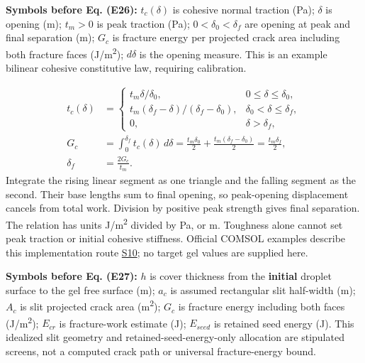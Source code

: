 \documentclass[10pt,a4paper]{article}
\begin{document}
\textbf{Symbols before Eq. (E26):} $t_c(\delta)$ is cohesive normal traction (Pa); $\delta$ is opening (m); $t_m>0$ is peak traction (Pa); $0<\delta_0<\delta_f$ are opening at peak and final separation (m); $G_c$ is fracture energy per projected crack area including both fracture faces (J/m\textsuperscript{2}); $d\delta$ is the opening measure. This is an example bilinear cohesive constitutive law, requiring calibration.

{\small\begin{align*}
t_c(\delta)&=\begin{cases}
t_m\delta/\delta_0,&0\le\delta\le\delta_0,\\
t_m(\delta_f-\delta)/(\delta_f-\delta_0),&\delta_0<\delta\le\delta_f,\\
0,&\delta>\delta_f,
\end{cases}\\
G_c&=\int_0^{\delta_f}t_c(\delta)\,d\delta
=\frac{t_m\delta_0}{2}+\frac{t_m(\delta_f-\delta_0)}2
=\frac{t_m\delta_f}{2},\\
\delta_f&=\frac{2G_c}{t_m}. \tag{E26}
\end{align*}}
Integrate the rising linear segment as one triangle and the falling segment as the second. Their base lengths sum to final opening, so peak-opening displacement cancels from total work. Division by positive peak strength gives final separation. The relation has units J/m\textsuperscript{2} divided by Pa, or m. Toughness alone cannot set peak traction or initial cohesive stiffness. Official COMSOL examples describe this implementation route \href{../../SOURCES.md}{S10}; no target gel values are supplied here.

\textbf{Symbols before Eq. (E27):} $h$ is cover thickness from the \textbf{initial} droplet surface to the gel free surface (m); $a_c$ is assumed rectangular slit half-width (m); $A_c$ is slit projected crack area (m\textsuperscript{2}); $G_c$ is fracture energy including both faces (J/m\textsuperscript{2}); $E_{cr}$ is fracture-work estimate (J); $E_{seed}$ is retained seed energy (J). This idealized slit geometry and retained-seed-energy-only allocation are stipulated screens, not a computed crack path or universal fracture-energy bound.
\end{document}
